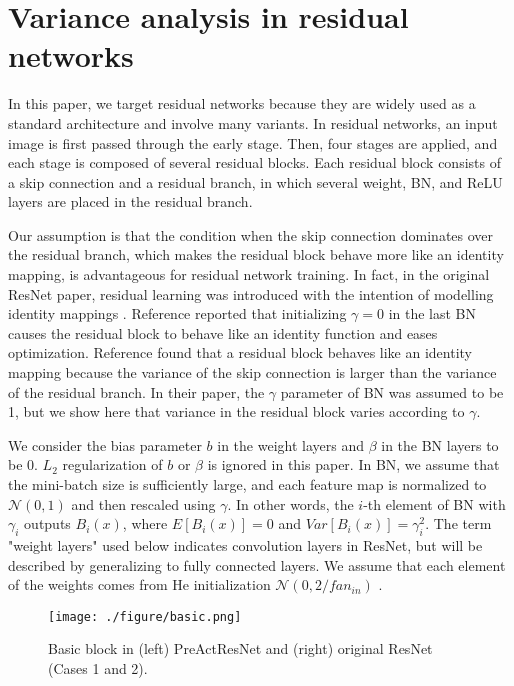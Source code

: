 \documentclass{article}
\begin{document}
\section{Variance analysis in residual networks}
\label{sec:varianceanalysisinresidualnetworks}
In this paper, we target residual networks because they are widely used as a standard architecture and involve many variants. In residual networks, an input image is first passed through the early stage. Then, four stages are applied, and each stage is composed of several residual blocks. Each residual block consists of a skip connection and a residual branch, in which several weight, BN, and ReLU layers are placed in the residual branch.

Our assumption is that the condition when the skip connection dominates over the residual branch, which makes the residual block behave more like an identity mapping, is advantageous for residual network training. In fact, in the original ResNet paper, residual learning was introduced with the intention of modelling identity mappings \cite{gcvpr/HeZRS16}. Reference \cite{gcorr/GoyalDGNWKTJH17} reported that initializing $\gamma=0$ in the last BN causes the residual block to behave like an identity function and eases optimization. Reference \cite{gnips/DeS20} found that a residual block behaves like an identity mapping because the variance of the skip connection is larger than the variance of the residual branch. In their paper, the $\gamma$ parameter of BN was assumed to be 1, but we show here that variance in the residual block varies according to $\gamma$.

We consider the bias parameter $b$ in the weight layers and $\beta$ in the BN layers to be 0. $L_2$ regularization of $b$ or $\beta$ is ignored in this paper. In BN, we assume that the mini-batch size is sufficiently large, and each feature map is normalized to $\mathcal{N}(0, 1)$ and then rescaled using $\gamma$. In other words, the $i$-th element of BN with $\gamma_i$ outputs $B_i(x)$, where $E[B_i(x)] = 0$ and $Var[B_i(x)] = \gamma_i^2$. The term "weight layers" used below indicates convolution layers in ResNet, but will be described by generalizing to fully connected layers. We assume that each element of the weights comes from He initialization $\mathcal{N}(0, 2/fan_{in})$ \cite{giccv/HeZRS15}.

\begin{figure}[t!]
	\centering
    \texttt{[image: ./figure/basic.png]}
\caption{Basic block in (left) PreActResNet and (right) original ResNet (Cases 1 and 2).}
	\label{fig:basic}
\end{figure}
\end{document}
